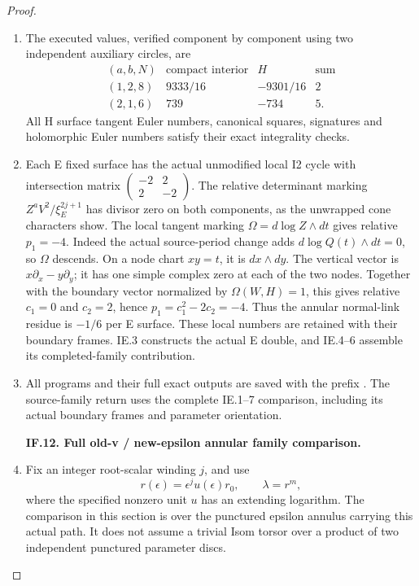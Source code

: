 \begin{proof}
\begin{enumerate}[label=\arabic*.]
\item The executed values, verified component by component using two
independent auxiliary circles, are
\[
 \begin{array}{c|rrr}
 (a,b,N)&\text{compact interior}&H&\text{sum}\\ \hline
 (1,2,8)&9333/16&-9301/16&2\\
 (2,1,6)&739&-734&5 .
 \end{array}                                           \tag{P3K.57.IF.32}
\]
All H surface tangent Euler numbers, canonical squares,
signatures and holomorphic Euler numbers satisfy their exact
integrality checks.

\item Each E fixed surface has the actual unmodified local I2 cycle
with intersection matrix \(\left(\begin{smallmatrix}-2&2\\2&-2\end{smallmatrix}\right)\).
The relative determinant marking \(Z^aV^2/\xi_E^{2j+1}\)
has divisor zero on both components, as the unwrapped cone
characters show. The local tangent marking
\(\Omega=d\log Z\wedge dt\) gives relative
\(p_1=-4\). Indeed the actual source-period change adds
\(d\log Q(t)\wedge dt=0\), so \(\Omega\) descends.
On a node chart \(xy=t\), it is \(dx\wedge dy\).
The vertical vector is \(x\partial_x-y\partial_y\);
it has one simple complex zero at each of the two nodes.
Together with the boundary vector normalized by
\(\Omega(W,H)=1\), this gives relative \(c_1=0\)
and \(c_2=2\), hence \(p_1=c_1^2-2c_2=-4\).
Thus the annular normal-link residue is \(-1/6\) per
E surface. These local numbers are retained with their
boundary frames. IE.3 constructs the actual E double,
and IE.4--6 assemble its completed-family contribution.

\item All programs and their full exact outputs are saved with the prefix
.
The source-family return uses the complete IE.1--7 comparison,
including its actual boundary frames and parameter orientation.

\par\medskip\noindent\textbf{IF.12. Full old-v / new-epsilon annular family comparison.}\par\nopagebreak[4]

\item Fix an integer root-scalar winding \(j\), and use
\[
 r(\epsilon)=\epsilon^j u(\epsilon)r_0,\qquad
 \lambda=r^m ,
\]
where the specified nonzero unit \(u\) has an extending
logarithm. The comparison in this section is over the
punctured epsilon annulus carrying this actual path.
It does not assume a trivial Isom torsor over a product
of two independent punctured parameter discs.


\end{enumerate}
\end{proof}
